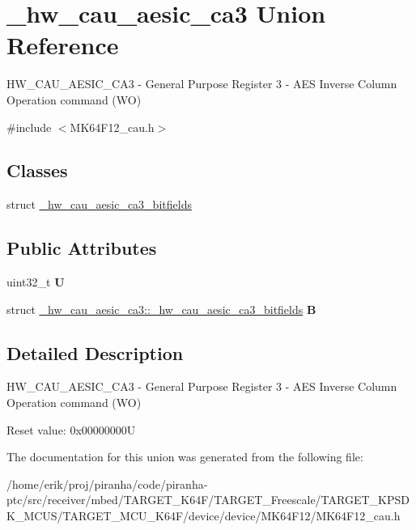 \hypertarget{union__hw__cau__aesic__ca3}{}\section{\+\_\+hw\+\_\+cau\+\_\+aesic\+\_\+ca3 Union Reference}
\label{union__hw__cau__aesic__ca3}


H\+W\+\_\+\+C\+A\+U\+\_\+\+A\+E\+S\+I\+C\+\_\+\+C\+A3 -\/ General Purpose Register 3 -\/ A\+ES Inverse Column Operation command (WO)  




{\ttfamily \#include $<$M\+K64\+F12\+\_\+cau.\+h$>$}

\subsection*{Classes}
\begin{DoxyCompactItemize}
\item 
struct \hyperlink{struct__hw__cau__aesic__ca3_1_1__hw__cau__aesic__ca3__bitfields}{\+\_\+hw\+\_\+cau\+\_\+aesic\+\_\+ca3\+\_\+bitfields}
\end{DoxyCompactItemize}
\subsection*{Public Attributes}
\begin{DoxyCompactItemize}
\item 
uint32\+\_\+t {\bfseries U}\hypertarget{union__hw__cau__aesic__ca3_aa891b518d7b559c3302fe947dfb75490}{}\label{union__hw__cau__aesic__ca3_aa891b518d7b559c3302fe947dfb75490}

\item 
struct \hyperlink{struct__hw__cau__aesic__ca3_1_1__hw__cau__aesic__ca3__bitfields}{\+\_\+hw\+\_\+cau\+\_\+aesic\+\_\+ca3\+::\+\_\+hw\+\_\+cau\+\_\+aesic\+\_\+ca3\+\_\+bitfields} {\bfseries B}\hypertarget{union__hw__cau__aesic__ca3_a86de22618168122fc4e1c9d4b1b4cfcf}{}\label{union__hw__cau__aesic__ca3_a86de22618168122fc4e1c9d4b1b4cfcf}

\end{DoxyCompactItemize}


\subsection{Detailed Description}
H\+W\+\_\+\+C\+A\+U\+\_\+\+A\+E\+S\+I\+C\+\_\+\+C\+A3 -\/ General Purpose Register 3 -\/ A\+ES Inverse Column Operation command (WO) 

Reset value\+: 0x00000000U 

The documentation for this union was generated from the following file\+:\begin{DoxyCompactItemize}
\item 
/home/erik/proj/piranha/code/piranha-\/ptc/src/receiver/mbed/\+T\+A\+R\+G\+E\+T\+\_\+\+K64\+F/\+T\+A\+R\+G\+E\+T\+\_\+\+Freescale/\+T\+A\+R\+G\+E\+T\+\_\+\+K\+P\+S\+D\+K\+\_\+\+M\+C\+U\+S/\+T\+A\+R\+G\+E\+T\+\_\+\+M\+C\+U\+\_\+\+K64\+F/device/device/\+M\+K64\+F12/M\+K64\+F12\+\_\+cau.\+h\end{DoxyCompactItemize}

